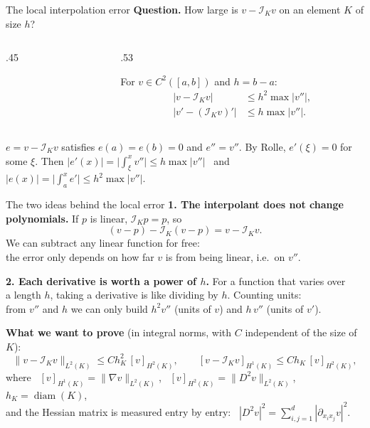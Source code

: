 \begin{frame}{The local interpolation error}
    \textbf{Question.} How large is $v - \mathcal I_K v$ on an element $K$ of size $h$?
    \begin{columns}[c,onlytextwidth]
        \begin{column}{.45\textwidth}
            \centering
        \end{column}
        \begin{column}{.53\textwidth}
            \begin{lemma}[Linear interpolant in $K = (a,b)$]
                For $v \in C^2([a,b])$ and $h = b - a$:
                \begin{align*}
                    |v - \mathcal I_K v|     & \le h^2 \max |v''|, \\
                    |v' - (\mathcal I_K v)'| & \le h \max |v''|.
                \end{align*}
            \end{lemma}
        \end{column}
    \end{columns}
    \begin{proofsteps}[Proof]
        $e = v - \mathcal I_K v$ satisfies $e(a) = e(b) = 0$ and $e'' = v''$. By Rolle, $e'(\xi) = 0$ for some $\xi$. Then
        $|e'(x)| = \big|\int_\xi^x v''\big| \le h \max|v''|$ \ and \ $|e(x)| = \big|\int_a^x e'\big| \le h^2 \max |v''|$.
    \end{proofsteps}
\end{frame}

\begin{frame}{The two ideas behind the local error}
    \textbf{1. The interpolant does not change polynomials.} If $p$ is linear, $\mathcal I_K p = p$, so
    \[
        (v - p) - \mathcal I_K(v - p) = v - \mathcal I_K v .
    \]
    We can subtract any linear function for free:\\ the error only depends on how far $v$ is from being linear, i.e.\ on $v''$.
    \medskip

    \textbf{2. Each derivative is worth a power of $h$.} For a function that varies over\\ a length $h$, taking a derivative is like dividing by $h$.
    Counting units:\\ from $v''$ and $h$ we can only build $h^2 v''$ (units of $v$) and $h\, v''$ (units of $v'$).
    \medskip

    \textbf{What we want to prove} (in integral norms, with $C$ independent of the size of $K$):
    \[
        \|v - \mathcal I_K v\|_{L^2(K)} \le C h_K^2\, [v]_{H^2(K)},
        \qquad
        [v - \mathcal I_K v]_{H^1(K)} \le C h_K\, [v]_{H^2(K)},
    \]
    where \ $[v]_{H^1(K)} = \|\nabla v\|_{L^2(K)}$, \ $[v]_{H^2(K)} = \|D^2 v\|_{L^2(K)}$, \ $h_K = \operatorname{diam}(K)$,\\
    and the Hessian matrix is measured entry by entry: \ $|D^2 v|^2 = \sum_{i,j=1}^d |\partial_{x_i x_j} v|^2$.
\end{frame}

